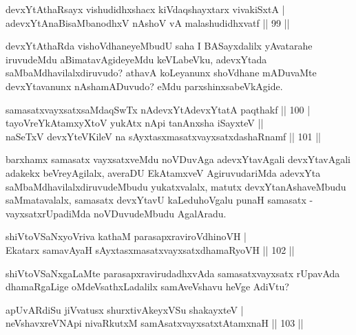 
\begin{shl}
devxYtAthaRsayx vishudidhxshacx kiVdaqshayxtarx vivakiSxtA |\\
adevxYtAnaBisaMbanodhxV nAshoV vA malashudidhxvatf \hfill || 99 ||
\end{shl}

\begin{artha}
devxYtAthaRda vishoVdhaneyeMbudU saha I BASayxdalilx yAvatarahe iruvudeMdu aBimatavAgideyeMdu keVLabeVku, adevxYtada saMbaMdhavilalxdiruvudo? athavA koLeyanunx shoVdhane mADuvaMte devxYtavanunx nAshamADuvudo? eMdu parxshinxsabeVkAgide.
\end{artha}


\begin{shl}
samasatxvayxsatxsaMdaqSwTx nAdevxYtAdevxYtatA paqthakf \hfill || 100 |\\
tayoVreYkAtamxyXtoV yukAtx nApi tanAnxsha iSayxteV ||\\
naSeTxV devxYteV\s KileV na sAyxtasxmasatxvayxsatxdashaRnamf \hfill || 101 ||
\end{shl}

\begin{artha}
barxhamx samasatx vayxsatxveMdu noVDuvAga adevxYtavAgali devxYtavAgali adakekx beVreyAgilalx, averaDU EkAtamxveV AgiruvudariMda adevxYta saMbaMdhavilalxdiruvudeMbudu yukatxvalalx, matutx devxYtanAshaveMbudu saMmatavalalx, samasatx devxYtavU kaLeduhoVgalu punaH samasatx - vayxsatxrUpadiMda noVDuvudeMbudu AgalAradu.
\end{artha}


\begin{shl}
shiVtoVSaNxyoVriva kathaM parasapxraviroVdhinoVH |\\
Ekatarx samavAyaH sAyxtasxmasatxvayxsatxdhamaRyoVH \hfill || 102 ||
\end{shl}

\begin{artha}
shiVtoVSaNxgaLaMte parasapxravirudadhxvAda samasatxvayxsatx rUpavAda dhamaRgaLige oMdeVsathxLadalilx samAveVshavu heVge AdiVtu? 
\end{artha}


\begin{shl}
apUvARdiSu jiVvatusx shurxtivAkeyxVSu shakayxteV |\\
neVshavxreVNApi nivaRkutxM samAsatxvayxsatxtA\s \s tamxnaH \hfill || 103 ||
\end{shl}

